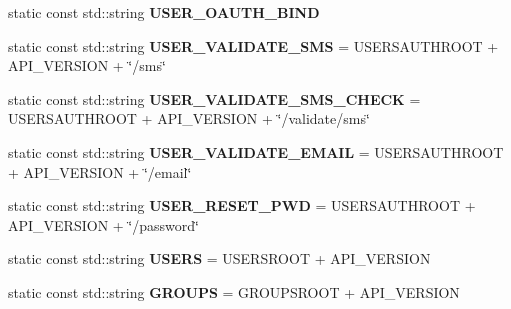 \begin{DoxyCompactItemize}
static const std\+::string {\bfseries U\+S\+E\+R\+\_\+\+O\+A\+U\+T\+H\+\_\+\+B\+I\+ND}
\item 
\mbox{\label{class_droi_r_e_s_tful_a_p_i_definition_a0a0ef39ea7e1749a81269424bd9dd667}} 
static const std\+::string {\bfseries U\+S\+E\+R\+\_\+\+V\+A\+L\+I\+D\+A\+T\+E\+\_\+\+S\+MS} = U\+S\+E\+R\+S\+A\+U\+T\+H\+R\+O\+OT + A\+P\+I\+\_\+\+V\+E\+R\+S\+I\+ON + \char`\"{}/sms\char`\"{}
\item 
\mbox{\label{class_droi_r_e_s_tful_a_p_i_definition_ad2f852b9bf6c58ce54465be44ae63b67}} 
static const std\+::string {\bfseries U\+S\+E\+R\+\_\+\+V\+A\+L\+I\+D\+A\+T\+E\+\_\+\+S\+M\+S\+\_\+\+C\+H\+E\+CK} = U\+S\+E\+R\+S\+A\+U\+T\+H\+R\+O\+OT + A\+P\+I\+\_\+\+V\+E\+R\+S\+I\+ON + \char`\"{}/validate/sms\char`\"{}
\item 
\mbox{\label{class_droi_r_e_s_tful_a_p_i_definition_aaf06248b575b533b95404f5ccacae578}} 
static const std\+::string {\bfseries U\+S\+E\+R\+\_\+\+V\+A\+L\+I\+D\+A\+T\+E\+\_\+\+E\+M\+A\+IL} = U\+S\+E\+R\+S\+A\+U\+T\+H\+R\+O\+OT + A\+P\+I\+\_\+\+V\+E\+R\+S\+I\+ON + \char`\"{}/email\char`\"{}
\item 
\mbox{\label{class_droi_r_e_s_tful_a_p_i_definition_af20c61a882ed3c516f0e38909c194303}} 
static const std\+::string {\bfseries U\+S\+E\+R\+\_\+\+R\+E\+S\+E\+T\+\_\+\+P\+WD} = U\+S\+E\+R\+S\+A\+U\+T\+H\+R\+O\+OT + A\+P\+I\+\_\+\+V\+E\+R\+S\+I\+ON + \char`\"{}/password\char`\"{}
\item 
\mbox{\label{class_droi_r_e_s_tful_a_p_i_definition_a49da2380b9213d5100c4599bcee5e49f}} 
static const std\+::string {\bfseries U\+S\+E\+RS} = U\+S\+E\+R\+S\+R\+O\+OT + A\+P\+I\+\_\+\+V\+E\+R\+S\+I\+ON
\item 
\mbox{\label{class_droi_r_e_s_tful_a_p_i_definition_a234d445ca3e6816f3e6b178adc027d82}} 
static const std\+::string {\bfseries G\+R\+O\+U\+PS} = G\+R\+O\+U\+P\+S\+R\+O\+OT + A\+P\+I\+\_\+\+V\+E\+R\+S\+I\+ON
\item 
\mbox{\label{class_droi_r_e_s_tful_a_p_i_definition_a45333a1fa56886c81cea40b41c117367}} 

\end{DoxyCompactItemize}
